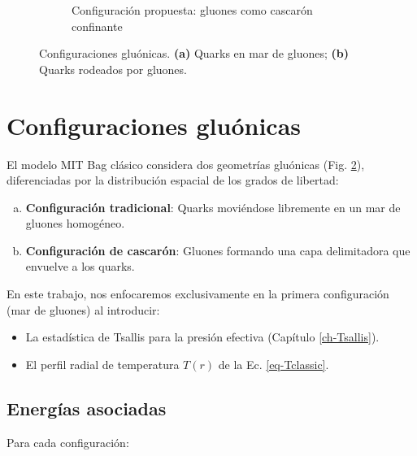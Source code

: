 \begin{figure}
\begin{subfigure}{0.21\textwidth}
        \caption{Configuración propuesta: gluones como cascarón confinante}
        \label{fig:shell}
    \end{subfigure}
    \caption[Configuraciones gluónicas del modelo de bolsa]{Configuraciones gluónicas. \textbf{(a)} Quarks en mar de gluones; \textbf{(b)} Quarks rodeados por gluones.}
    \label{fig:configs}
\end{figure}
\section{Configuraciones gluónicas}\label{fig-gluon-configs}

El modelo MIT Bag clásico considera dos geometrías gluónicas (Fig. \ref{fig:configs}), diferenciadas por la distribución espacial de los grados de libertad:


\begin{enumerate}[(a)]
    \item \textbf{Configuración tradicional}: Quarks moviéndose libremente en un mar de gluones homogéneo.
    \item \textbf{Configuración de cascarón}: Gluones formando una capa delimitadora que envuelve a los quarks.
\end{enumerate}

En este trabajo, nos enfocaremos exclusivamente en la primera configuración (mar de gluones) al introducir:
\begin{itemize}
    \item La estadística de Tsallis para la presión efectiva (Capítulo \ref{ch-Tsallis}).
    \item El perfil radial de temperatura $T(r)$ de la Ec. \eqref{eq-Tclassic}.
\end{itemize}

\subsection{Energías asociadas}
Para cada configuración:


